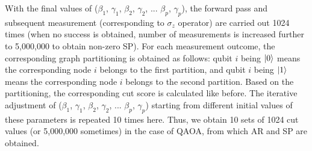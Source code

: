 \documentclass[10pt]{article}
\begin{document}





With the final values of ($\beta_1$, $\gamma_1$, $\beta_2$, $\gamma_2$, ... $\beta_p$, $\gamma_p$), the forward pass and subsequent measurement (corresponding to $\sigma_z$ operator) are carried out 1024 times (when no success is obtained, number of measurements is increased further to 5,000,000 to obtain non-zero SP). For each measurement outcome, the corresponding graph partitioning is obtained as follows: qubit $i$ being $\ket{0}$ means the corresponding node $i$ belongs to the first partition, and qubit $i$ being $\ket{1}$ means the corresponding node $i$ belongs to the second partition. Based on the partitioning, the corresponding cut score is calculated like before. The iterative adjustment of ($\beta_1$, $\gamma_1$, $\beta_2$, $\gamma_2$, ... $\beta_p$, $\gamma_p$) starting from different initial values of these parameters is repeated 10 times here. Thus, we obtain 10 sets of 1024 cut values (or 5,000,000 sometimes) in the case of QAOA, from which AR and SP are obtained.
\end{document}
